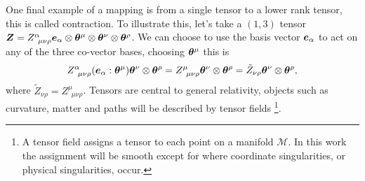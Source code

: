 One final example of a mapping is from a single tensor to a lower rank tensor, this is called contraction. To illustrate this, let's take a $(1,3)$ tensor $\boldsymbol{Z} = Z^\alpha_{\,\,\,\mu\nu\rho} \boldsymbol{e}_\alpha \otimes\boldsymbol{\theta}^\mu\otimes\boldsymbol{\theta}^\nu\otimes\boldsymbol{\theta}^\rho$. We can choose to use the basis vector $\boldsymbol{e}_\alpha$ to act on any of the three co-vector bases, choosing $\boldsymbol{\theta}^\mu$ this is
\begin{equation}
Z^\alpha_{\,\,\,\mu\nu\rho} (\boldsymbol{e}_\alpha : \boldsymbol{\theta}^\mu)\boldsymbol{\theta}^\nu\otimes\boldsymbol{\theta}^\rho = Z^\mu_{\,\,\,\mu\nu\rho}\boldsymbol{\theta}^\nu\otimes\boldsymbol{\theta}^\rho = \tilde{Z}_{\nu\rho}\boldsymbol{\theta}^\nu\otimes\boldsymbol{\theta}^\rho,
\end{equation}
where $\tilde{Z}_{\nu\rho} = Z^\mu_{\,\,\,\mu\nu\rho}$. Tensors are central to general
relativity, objects such as curvature, matter and paths will be described by tensor fields
\footnote{A tensor field assigns a tensor to each point on a manifold $\mathcal{M}$.
In this work the assignment will be smooth except for where coordinate singularities, or physical singularities, occur.
}.





